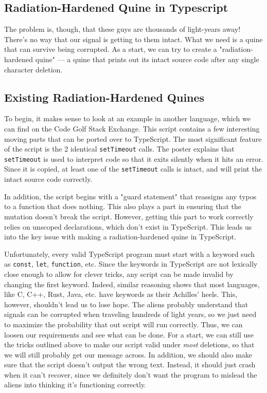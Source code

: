 \documentclass{article}
\begin{document}


\subsection*{Radiation-Hardened Quine in Typescript}
The problem is, though, that these guys are thousands of light-years away!
There's no way that our signal is getting to them intact.
What we need is a quine that can survive being corrupted.
As a start, we can try to create a "radiation-hardened quine" --- a quine that prints out its intact source code after any single character deletion.

\subsection*{Existing Radiation-Hardened Quines}
To begin, it makes sense to look at an example in another language, which we can find on the Code Golf Stack Exchange\cite{se-js}.
This script contains a few interesting moving parts that can be ported over to TypeScript.
The most significant feature of the script is the 2 identical \verb|setTimeout| calls.
The poster explains that \verb|setTimeout| is used to interpret code so that it exits silently when it hits an error.
Since it is copied, at least one of the \verb|setTimeout| calls is intact, and will print the intact source code correctly.

In addition, the script begins with a "guard statement" that reassigns any typos to a function that does nothing.
This also plays a part in ensuring that the mutation doesn't break the script.
However, getting this part to work correctly relies on unscoped declarations,
    which don't exist in TypeScript.
This leads us into the key issue with making a radiation-hardened quine in TypeScript.

Unfortunately, every valid TypeScript program must start with a keyword such as \verb|const|, \verb|let|, \verb|function|, etc.
Since the keywords in TypeScript are not lexically close enough to allow for clever tricks, any script can be made invalid by changing the first keyword.
Indeed, similar reasoning shows that most languages, like C, C++, Rust, Java, etc. have keywords as their Achilles' heels.
This, however, shouldn't lead us to lose hope.
The aliens probably understand that signals can be corrupted when traveling hundreds of light years,
    so we just need to maximize the probability that out script will run correctly.
Thus, we can loosen our requirements and see what can be done.
For a start, we can still use the tricks outlined above to make our script valid under \textit{most} deletions, so that we will still probably get our message across.
In addition, we should also make sure that the script doesn't output the wrong text.
Instead, it should just crash when it can't recover,
    since we definitely don't want the program to mislead the aliens into thinking it's functioning correctly.
\end{document}
